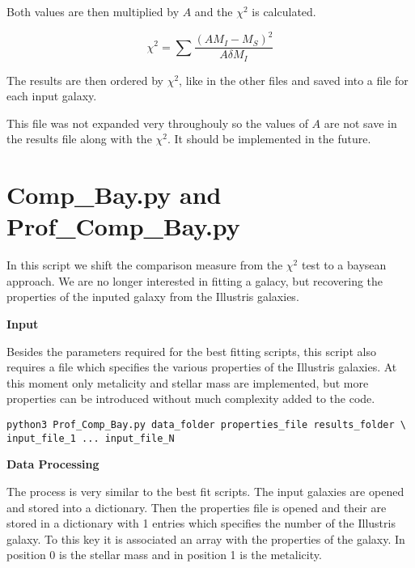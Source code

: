 \documentclass[11pt]{article}
\begin{document}
Both values are then multiplied by $A$ and the $\chi^2$ is calculated.

\begin{equation}
\chi^2 = \sum \frac{ (AM_I - M_S)^2}{A\delta M_I}
\end{equation}

The results are then ordered by $\chi^2$, like in the other files and saved into a file for each input galaxy.

This file was not expanded very throughouly so the values of $A$ are not save in the results file along with the $\chi^2$. It should be implemented in the future.

\newpage


\section{Comp\_Bay.py and Prof\_Comp\_Bay.py}

In this script we shift the comparison measure from the $\chi^2$ test to a baysean approach. We are no longer interested in fitting a galacy, but recovering the properties of the inputed galaxy from the Illustris galaxies.

{\bf Input}

Besides the parameters required for the best fitting scripts, this script also requires a file which specifies the various properties of the Illustris galaxies. At this moment only metalicity and stellar mass are implemented, but more properties can be introduced without much complexity added to the code.

\begin{verbatim}
python3 Prof_Comp_Bay.py data_folder properties_file results_folder \
input_file_1 ... input_file_N
\end{verbatim}

{\bf Data Processing}

The process is very similar to the best fit scripts. The input galaxies are opened and stored into a dictionary. 
Then the properties file is opened and their are stored in a dictionary with 1 entries which specifies the number of the Illustris galaxy. To this key it is associated an array with the properties of the galaxy. In position 0 is the stellar mass and in position 1 is the metalicity.
\end{document}
